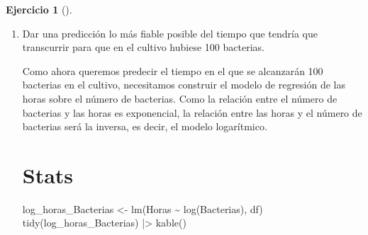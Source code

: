 \documentclass[
  a4paper,
]{scrreport}
\newenvironment{Shaded}{\begin{snugshade}}{\end{snugshade}}
\newcommand{\ExtensionTok}[1]{\textcolor[rgb]{0.00,0.23,0.31}{#1}}
\newcommand{\FunctionTok}[1]{\textcolor[rgb]{0.28,0.35,0.67}{#1}}
\newcommand{\NormalTok}[1]{\textcolor[rgb]{0.00,0.23,0.31}{#1}}
\newcommand{\OtherTok}[1]{\textcolor[rgb]{0.00,0.23,0.31}{#1}}
\newcommand{\SpecialCharTok}[1]{\textcolor[rgb]{0.37,0.37,0.37}{#1}}
\theoremstyle{definition}
\newtheorem{exercise}{Ejercicio}[chapter]
\theoremstyle{remark}
\begin{document}
\begin{exercise}[]
\begin{enumerate}
\begin{tcolorbox}
  \section{Copilot}

\begin{Shaded}
\begin{Highlighting}[]
\ExtensionTok{Utilizar}\NormalTok{ el modelo de regresión exponencial del número de bacterias sobre el número de horas para predecir el número de bacterias al cabo de 3.5 horas y 10 horas, aplicando la función exponencial a la predicción del modelo lineal del logaritmo del número de bacterias sobre el número de horas.}
\end{Highlighting}
\end{Shaded}

  Las predicciones no son muy fiables ya que, aunque el coeficiente de
  determinación está próximo a 1, el tamaño de la muestra es muy
  pequeño.

  \end{tcolorbox}
\item
  Dar una predicción lo más fiable posible del tiempo que tendría que
  transcurrir para que en el cultivo hubiese 100 bacterias.

  \begin{tcolorbox}[enhanced jigsaw, colframe=quarto-callout-tip-color-frame, toprule=.15mm, bottomtitle=1mm, breakable, opacitybacktitle=0.6, toptitle=1mm, colback=white, bottomrule=.15mm, title=\textcolor{quarto-callout-tip-color}{\faLightbulb}\hspace{0.5em}{Solución}, arc=.35mm, left=2mm, titlerule=0mm, rightrule=.15mm, coltitle=black, leftrule=.75mm, opacityback=0, colbacktitle=quarto-callout-tip-color!10!white]

  Como ahora queremos predecir el tiempo en el que se alcanzarán 100
  bacterias en el cultivo, necesitamos construir el modelo de regresión
  de las horas sobre el número de bacterias. Como la relación entre el
  número de bacterias y las horas es exponencial, la relación entre las
  horas y el número de bacterias será la inversa, es decir, el modelo
  logarítmico.

  \section{Stats}

\begin{Shaded}
\begin{Highlighting}[]
\NormalTok{log\_horas\_Bacterias }\OtherTok{\textless{}{-}} \FunctionTok{lm}\NormalTok{(Horas }\SpecialCharTok{\textasciitilde{}} \FunctionTok{log}\NormalTok{(Bacterias), df) }
\FunctionTok{tidy}\NormalTok{(log\_horas\_Bacterias) }\SpecialCharTok{|\textgreater{}} \FunctionTok{kable}\NormalTok{()}
\end{Highlighting}
\end{Shaded}


\end{tcolorbox}
\end{enumerate}
\end{exercise}
\end{document}
